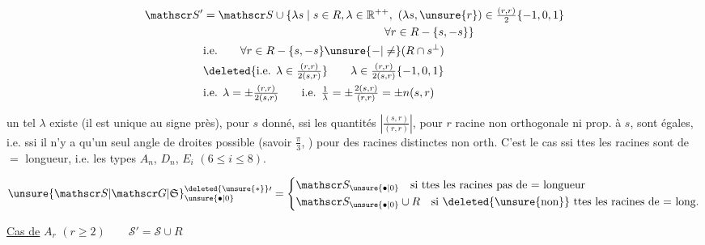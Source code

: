 \[
\begin{aligned}
\mathscr S'&=\mathscr S\cup\{\lambda s\mid s\in R,\lambda\in\mathbb R^{++},\
 (\lambda s,\unsure{r})\in\tfrac{(r,r)}2\{-1,0,1\}\\
&\hspace{16em}\forall r\in R-\{s,-s\}\}\\
&\text{i.e.}\qquad \forall r\in R-\{s,-s\}\unsure{-|\ne}(R\cap s^\perp)\\
&\deleted{\text{i.e. }\lambda\in\tfrac{(r,r)}{2(s,r)}}\qquad
 \lambda\in\tfrac{(r,r)}{2(s,r)}\{-1,0,1\}\\
&\text{i.e. }\lambda=\pm\tfrac{(r,r)}{2(s,r)}\qquad
 \text{i.e. }\tfrac1\lambda=\pm\tfrac{2(s,r)}{(r,r)}=\pm n(s,r)
\end{aligned}
\]

un tel $\lambda$ existe (il est unique au signe près), pour $s$ donné, ssi les quantités $\left|\frac{(s,r)}{(r,r)}\right|$, pour $r$ racine non orthogonale ni prop. à $s$, sont égales, i.e. ssi il n’y a qu’un seul angle de droites possible (savoir $\frac\pi3$, ) pour des racines distinctes non orth. C’est le cas ssi ttes les racines sont de $=$ longueur, i.e. les types $A_n$, $D_n$, $E_i$ $(6\leq i\leq8)$.


\[
\unsure{\mathscr S|\mathscr G|\mathfrak S}_{\unsure{\bullet|0}}^{\deleted{\unsure{*}}\prime}
=\left\{\begin{aligned}
&\mathscr S_{\unsure{\bullet|0}}\quad\text{si ttes les racines pas de $=$ longueur}\\
&\mathscr S_{\unsure{\bullet|0}}\cup R\quad\text{si \deleted{\unsure{non}} ttes les racines de $=$ long.}
\end{aligned}\right.
\]

\deleted{%
\[
\begin{aligned}
\mathscr S'_0&=\left\{\begin{aligned}&\mathscr S_0\text{ si ttes les}\\&\unsure{\subset}\mathscr S_0\text{ si ttes les racines pas de $=$ longueur}\end{aligned}\right.\\
\mathscr S'_0&=\\
\mathscr S'_0&\cap\mathscr S
\end{aligned}
\]
}

\uline{Cas de} $A_r$ $(r\geq2)\qquad \mathscr S'=\mathscr S\cup R$

